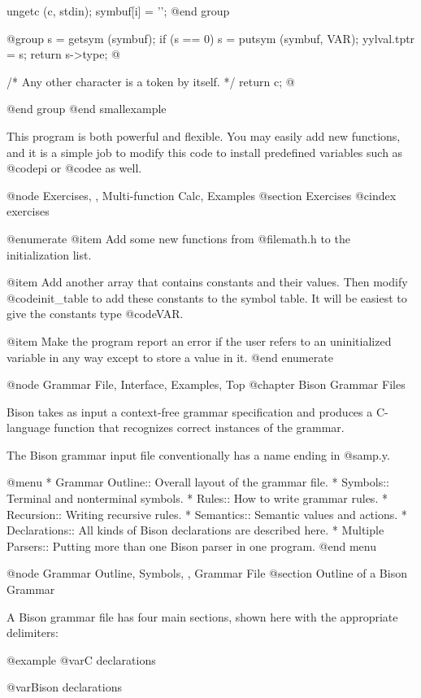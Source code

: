 {{{{{{{{{{{{{{{{      ungetc (c, stdin);
      symbuf[i] = '\0';
@end group

@group
      s = getsym (symbuf);
      if (s == 0)
        s = putsym (symbuf, VAR);
      yylval.tptr = s;
      return s->type;
    @}

  /* Any other character is a token by itself.        */
  return c;
@}
@end group
@end smallexample

This program is both powerful and flexible. You may easily add new
functions, and it is a simple job to modify this code to install predefined
variables such as @code{pi} or @code{e} as well.

@node Exercises,  , Multi-function Calc, Examples
@section Exercises
@cindex exercises

@enumerate
@item
Add some new functions from @file{math.h} to the initialization list.

@item
Add another array that contains constants and their values.  Then
modify @code{init_table} to add these constants to the symbol table.
It will be easiest to give the constants type @code{VAR}.

@item
Make the program report an error if the user refers to an
uninitialized variable in any way except to store a value in it.
@end enumerate

@node Grammar File, Interface, Examples, Top
@chapter Bison Grammar Files

Bison takes as input a context-free grammar specification and produces a
C-language function that recognizes correct instances of the grammar.

The Bison grammar input file conventionally has a name ending in @samp{.y}.

@menu
* Grammar Outline::   Overall layout of the grammar file.
* Symbols::           Terminal and nonterminal symbols.
* Rules::             How to write grammar rules.
* Recursion::         Writing recursive rules.
* Semantics::         Semantic values and actions.
* Declarations::      All kinds of Bison declarations are described here.
* Multiple Parsers::  Putting more than one Bison parser in one program.
@end menu

@node Grammar Outline, Symbols,  , Grammar File
@section Outline of a Bison Grammar

A Bison grammar file has four main sections, shown here with the
appropriate delimiters:

@example
@var{C declarations}

@var{Bison declarations}

}}}}}}}}}}}}}}
